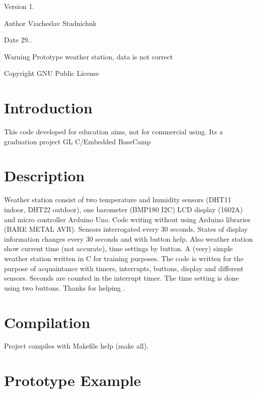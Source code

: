 \begin{DoxyVersion}{Version}
1. 
\end{DoxyVersion}
\begin{DoxyAuthor}{Author}
Viacheslav Stadnichuk 
\end{DoxyAuthor}
\begin{DoxyDate}{Date}
29.. 
\end{DoxyDate}
\begin{DoxyWarning}{Warning}
Prototype weather station, data is not correct 
\end{DoxyWarning}
\begin{DoxyCopyright}{Copyright}
G\+NU Public License 
\end{DoxyCopyright}
\section{Introduction}\label{index_intro_sec}
This code developed for education aims, not for commercial using. It\textquotesingle{}s a graduation project GL C/\+Embedded Base\+Camp \section{Description}\label{index_desc}
Weather station consist of two temperature and humidity sensors (D\+H\+T11 indoor, D\+H\+T22 outdoor), one barometer (B\+M\+P180 I2C) L\+CD display (1602A) and micro controller Arduino Uno. Code writing without using Arduino libraries (B\+A\+RE M\+E\+T\+AL A\+VR). Sensors interrogated every 30 seconds. States of display information changes every 30 seconds and with button help. Also weather station show current time (not accurate), time settings by button. A (very) simple weather station written in C for training purposes. The code is written for the purpose of acquaintance with timers, interrupts, buttons, display and different sensors. Seconds are counted in the interrupt timer. The time setting is done using two buttons. Thanks for helping . \section{Compilation}\label{index_compile_sec}
Project compiles with Makefile help (make all). \section{Prototype Example}\label{index_prot}
 